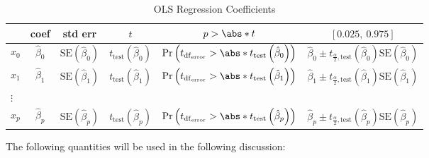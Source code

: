 \documentclass{article}
\begin{document}
\begin{table}[H]
    \centering
    \begin{tabular}{lccccc}
        \toprule
                & \textbf{coef}     & \textbf{std err}                            & \(t\)                                             & \(p > \abs*{t}\)                                                                                                & \(\left[0.025,\:  0.975 \right]\)                                                                                            \\
        \midrule
        \(x_0\) & \(\hat{\beta}_0\) & \(\mathrm{SE}\left( \hat{\beta}_0 \right)\) & \(t_{\mathrm{test}}\left( \hat{\beta}_0 \right)\) & \(\Pr{\left( t_{\mathrm{df}_{\mathrm{error}}} > \abs*{t_{\mathrm{test}}\left( \hat{\beta}_0 \right)} \right)}\) & \(\hat{\beta}_0 \pm t_{\frac{\alpha}{2},\mathrm{test}}\left( \hat{\beta}_0 \right) \mathrm{SE}\left( \hat{\beta}_0 \right)\) \\
        \(x_1\) & \(\hat{\beta}_1\) & \(\mathrm{SE}\left( \hat{\beta}_1 \right)\) & \(t_{\mathrm{test}}\left( \hat{\beta}_1 \right)\) & \(\Pr{\left( t_{\mathrm{df}_{\mathrm{error}}} > \abs*{t_{\mathrm{test}}\left( \hat{\beta}_1 \right)} \right)}\) & \(\hat{\beta}_1 \pm t_{\frac{\alpha}{2},\mathrm{test}}\left( \hat{\beta}_1 \right) \mathrm{SE}\left( \hat{\beta}_1 \right)\) \\
        \(\vdots\)                                                                                                                                                                                                                                                                                                                                                                     \\
        \(x_p\) & \(\hat{\beta}_p\) & \(\mathrm{SE}\left( \hat{\beta}_p \right)\) & \(t_{\mathrm{test}}\left( \hat{\beta}_p \right)\) & \(\Pr{\left( t_{\mathrm{df}_{\mathrm{error}}} > \abs*{t_{\mathrm{test}}\left( \hat{\beta}_p \right)} \right)}\) & \(\hat{\beta}_p \pm t_{\frac{\alpha}{2},\mathrm{test}}\left( \hat{\beta}_p \right) \mathrm{SE}\left( \hat{\beta}_p \right)\) \\
        \bottomrule
    \end{tabular}
    \caption{OLS Regression Coefficients} %
\end{table}
The following quantities will be used in the following discussion:
\end{document}
